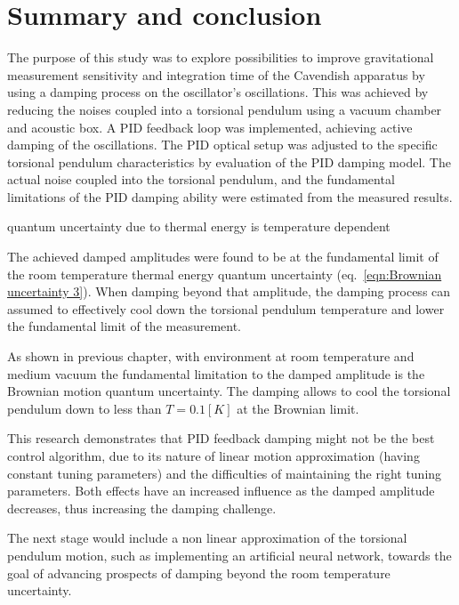 \documentclass[\main/master.tex]{subfiles}
\begin{document}
\newspacing
\chapter{Summary and conclusion}\label{chapter:Summary and conclusion}
The purpose of this study was to explore possibilities to improve gravitational measurement sensitivity and integration time of the Cavendish apparatus by using a damping process on the oscillator's oscillations. This was achieved by reducing the noises coupled into a torsional pendulum using a vacuum chamber and acoustic box. A PID feedback loop was implemented, achieving active damping of the oscillations. The PID optical setup was adjusted to the specific torsional pendulum characteristics by evaluation of the PID damping model. The actual noise coupled into the torsional pendulum, and the fundamental limitations of the PID damping ability were estimated from the measured results.
\par\noindent
quantum uncertainty due to thermal energy is temperature dependent

The achieved damped amplitudes were found to be at the fundamental limit of the room temperature thermal energy quantum uncertainty (eq.~\ref{eqn:Brownian uncertainty 3}). When damping beyond that amplitude, the damping process can assumed to effectively cool down the torsional pendulum temperature and lower the fundamental limit of the measurement. 
\par\noindent
As shown in previous chapter, with environment at room temperature and medium vacuum the fundamental limitation to the damped amplitude is the Brownian motion quantum uncertainty. The damping allows to cool the torsional pendulum down to less than $T=0.1[K]$ at the Brownian limit.
\par\noindent
This research demonstrates that PID feedback damping might not be the best control algorithm, due to its nature of linear motion approximation (having constant tuning parameters) and the difficulties of maintaining the right tuning parameters. Both effects have an increased influence as the damped amplitude decreases, thus increasing the damping challenge.
\par\noindent
The next stage would include a non linear approximation of the torsional pendulum motion, such as implementing an artificial neural network, towards the goal of advancing prospects of damping beyond the room temperature uncertainty. 
\end{document}
